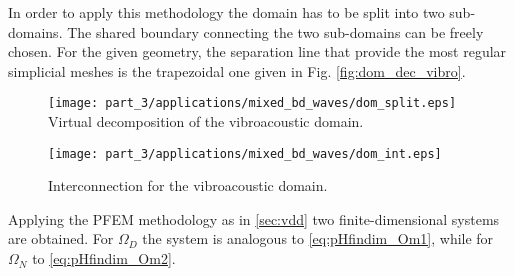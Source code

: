 In order to apply this methodology the domain has to be split into two sub-domains. The shared boundary connecting the two sub-domains can be freely chosen. For the given geometry, the separation line that provide the most regular simplicial meshes is the trapezoidal one given in Fig. \ref{fig:dom_dec_vibro}. 
\begin{figure}[t]
	\begin{minipage}[b]{0.48\linewidth}
			\centering
			\texttt{[image: part\_3/applications/mixed\_bd\_waves/dom\_split.eps]} \\
			\caption{Virtual decomposition of the vibroacoustic domain.}
			\label{fig:dom_dec_vibro}
	\end{minipage}
	\hspace{0.5cm}
	\begin{minipage}[b]{0.48\linewidth}
		\centering
		\texttt{[image: part\_3/applications/mixed\_bd\_waves/dom\_int.eps]}
		\caption{Interconnection for the vibroacoustic domain.}
		\label{fig:dom_int_vibro}
	\end{minipage}
\end{figure}

Applying the PFEM methodology as in \ref{sec:vdd} two finite-dimensional systems are obtained. For $\Omega_D$ the system is analogous to \eqref{eq:pHfindim_Om1}, while 
for $\Omega_N$ to \eqref{eq:pHfindim_Om2}.

